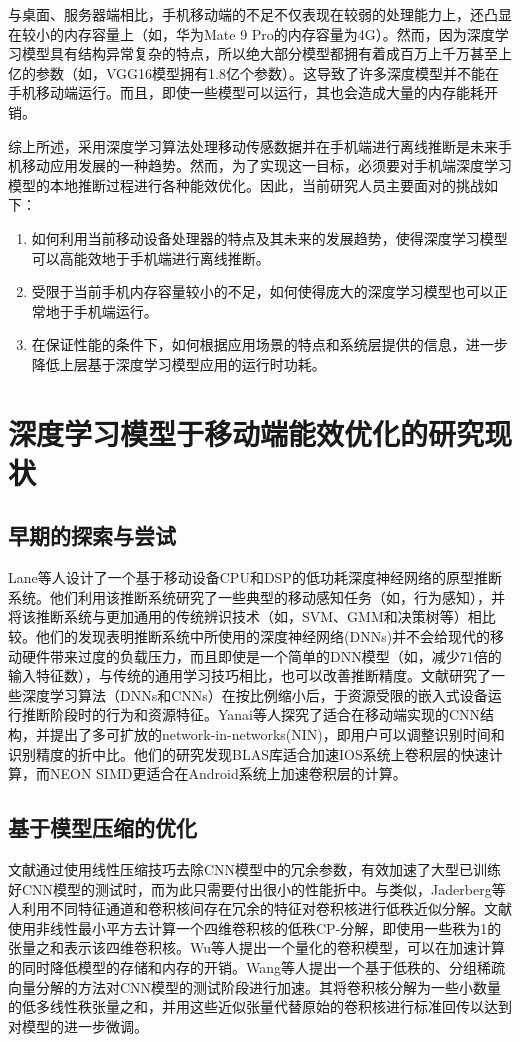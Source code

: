 与桌面、服务器端相比，手机移动端的不足不仅表现在较弱的处理能力上，还凸显在较小的内存容量上（如，华为Mate 9 Pro的内存容量为4G）。然而，因为深度学习模型具有结构异常复杂的特点，所以绝大部分模型都拥有着成百万上千万甚至上亿的参数（如，VGG16模型拥有1.8亿个参数）。这导致了许多深度模型并不能在手机移动端运行。而且，即使一些模型可以运行，其也会造成大量的内存能耗开销。

综上所述，采用深度学习算法处理移动传感数据并在手机端进行离线推断是未来手机移动应用发展的一种趋势。然而，为了实现这一目标，必须要对手机端深度学习模型的本地推断过程进行各种能效优化。因此，当前研究人员主要面对的挑战如下：

\begin{enumerate}
\item  如何利用当前移动设备处理器的特点及其未来的发展趋势，使得深度学习模型可以高能效地于手机端进行离线推断。
\item 受限于当前手机内存容量较小的不足，如何使得庞大的深度学习模型也可以正常地于手机端运行。
\item 在保证性能的条件下，如何根据应用场景的特点和系统层提供的信息，进一步降低上层基于深度学习模型应用的运行时功耗。
\end{enumerate}

\section{深度学习模型于移动端能效优化的研究现状}
\subsection{早期的探索与尝试}
Lane等人\cite{lane2015can}设计了一个基于移动设备CPU和DSP的低功耗深度神经网络的原型推断系统。他们利用该推断系统研究了一些典型的移动感知任务（如，行为感知），并将该推断系统与更加通用的传统辨识技术（如，SVM、GMM和决策树等）相比较。他们的发现表明推断系统中所使用的深度神经网络(DNNs)并不会给现代的移动硬件带来过度的负载压力，而且即使是一个简单的DNN模型（如，减少71倍的输入特征数），与传统的通用学习技巧相比，也可以改善推断精度。文献\cite{lane2015early}研究了一些深度学习算法（DNNs和CNNs）在按比例缩小后，于资源受限的嵌入式设备运行推断阶段时的行为和资源特征。Yanai等人\cite{yanai2016efficient}探究了适合在移动端实现的CNN结构，并提出了多可扩放的network-in-networks(NIN)，即用户可以调整识别时间和识别精度的折中比。他们的研究发现BLAS库适合加速IOS系统上卷积层的快速计算，而NEON SIMD更适合在Android系统上加速卷积层的计算。
\subsection{基于模型压缩的优化}
文献\cite{denton2014exploiting}通过使用线性压缩技巧去除CNN模型中的冗余参数，有效加速了大型已训练好CNN模型的测试时，而为此只需要付出很小的性能折中。与\cite{denton2014exploiting}类似，Jaderberg等人\cite{jaderberg2014speeding}利用不同特征通道和卷积核间存在冗余的特征对卷积核进行低秩近似分解。文献\cite{lebedev2014speeding}使用非线性最小平方去计算一个四维卷积核的低秩CP-分解，即使用一些秩为1的张量之和表示该四维卷积核。Wu等人\cite{wu2016quantized}提出一个量化的卷积模型，可以在加速计算的同时降低模型的存储和内存的开销。Wang等人\cite{wang2016accelerating}提出一个基于低秩的、分组稀疏向量分解的方法对CNN模型的测试阶段进行加速。其将卷积核分解为一些小数量的低多线性秩张量之和，并用这些近似张量代替原始的卷积核进行标准回传以达到对模型的进一步微调。
